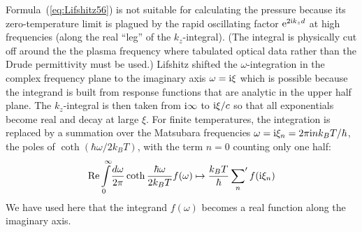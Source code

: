 \documentclass[11pt, oneside]{article}   	%
\begin{document}
Formula~(\ref{eq:Lifshitz56}) is not suitable for calculating the pressure
because its zero-temperature limit is plagued by the rapid oscillating factor
${\rm e}^{2{\rm i} k_z d}$ at high frequencies (along the real ``leg'' of the $k_z$-integral).
(The integral is physically cut off around the the plasma frequency where 
tabulated optical data rather than the Drude permittivity must be used.)
Lifshitz shifted the $\omega$-integration in the complex frequency plane
to the imaginary axis $\omega = {\rm i} \xi$ which is possible because the integrand
is built from response functions that are analytic in the upper half plane.
The $k_z$-integral is then
taken from ${\rm i}\infty$ to ${\rm i}\xi/c$ so that all exponentials become real
and decay at large $\xi$. 
For finite temperatures, the integration is replaced by a summation 
over the Matsubara frequencies $\omega = {\rm i}\xi_n = 2\pi {\rm i} n k_BT / \hbar$, 
the poles of $\coth( \hbar \omega / 2k_BT)$, with the term $n = 0$ counting only one half:
\begin{equation}
\mathop{\rm Re}
\int\limits_0^\infty\!\frac{d\omega}{2\pi} \coth\frac{\hbar\omega}{2k_BT} f( \omega )
\mapsto
\frac{ k_BT }{ \hbar } \sideset{}{'}\sum_n f( {\rm i} \xi_n )
\label{eq:map-to-Matsubara-sum}
\end{equation}
We have used here that the integrand $f( \omega )$ becomes a real function along the
imaginary axis. 
\end{document}
